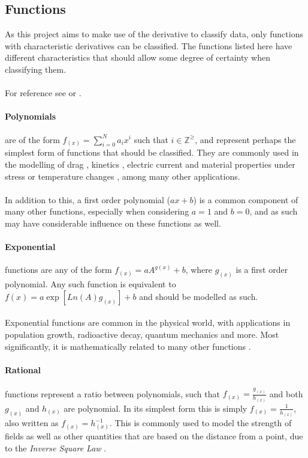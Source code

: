 \documentclass[main.tex]{subfiles}
\begin{document}
    \subsection{Functions}
    
    As this project aims to make use of the derivative to classify data, only functions with characteristic derivatives can be classified. The functions listed here have different characteristics that should allow some degree of certainty when classifying them.
    \\\\
    For reference see \citet[Chapter~M1]{tipler} or \citet{functionsHandbook}.
    
    \paragraph{Polynomials} are of the form $f_{(x)}=\sum_{i=0}^{N} a_i x^i$ such that $i \in \mathbb{Z}^\geq$, and represent perhaps the simplest form of functions that should be classified. They are commonly used in the modelling of drag \cite[Chapter~5,13]{tipler}, kinetics \cite[Chapter~4,6]{tipler}, electric current \cite[Chapter~25]{tipler} and material properties under stress \cite[Chapter~12]{tipler} or temperature changes \cite[Chapter~20]{tipler}, among many other applications. 
    \\\\
    In addition to this, a first order polynomial ($a x + b$) is a common component of many other functions, especially when considering $a=1$ and $b=0$, and as such may have considerable influence on these functions as well.
    
    \paragraph{Exponential} functions are any of the form $f_{(x)}= a A^{g(x)} + b$, where $g_{(x)}$ is a first order polynomial. Any such function is equivalent to $ f{(x)} =  a \exp[  Ln(A) g_{(x)}  ] +b $ and should be modelled as such. 
    \\\\
    Exponential functions are common in the physical world, with applications in population growth, radioactive decay, quantum mechanics and more. Most significantly, it is mathematically related to many other functions \cite[Chapter~5]{modellingPrinciples}.
    
    \paragraph{Rational} functions represent a ratio between polynomials, such that $f_{(x)}=\frac{g_{(x)}}{h_{(x)}}$ and both $g_{(x)}$ and $h_{(x)}$ are polynomial. In its simplest form this is simply $f_{(x)}=\frac{1}{h_{(x)}}$, also written as $f_{(x)}=h_{(x)}^{-1}$. This is commonly used to model the strength of fields as well as other quantities that are based on the distance from a point, due to the \textit{Inverse Square Law} \cite[Chapter~11,21,26]{tipler}. 
    
\end{document}
